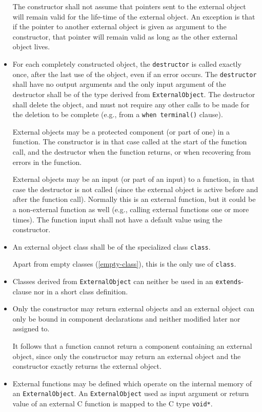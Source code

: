 \begin{itemize}
  The constructor shall not assume that pointers sent to the external object will remain valid for the life-time of the external object.
  An exception is that if the pointer to another external object is given as argument to the constructor, that pointer will remain valid as long as the other external object lives.
\item
  For each completely constructed object, the {\lstinline!destructor!} is called exactly once, after the last use of the object, even if an error occurs.
  The {\lstinline!destructor!} shall have no output arguments and the only input argument of the destructor shall be of the type derived from {\lstinline!ExternalObject!}.
  The destructor shall delete the object, and must not require any other calls to be made for the deletion to be complete (e.g., from a {\lstinline!when terminal()!} clause).
  \begin{nonnormative}
  External objects may be a protected component (or part of one) in a function.
  The constructor is in that case called at the start of the function call, and the destructor when the function returns, or when recovering from errors in the function.
  \end{nonnormative}
  \begin{nonnormative}
  External objects may be an input (or part of an input) to a function, in that case the destructor is not called (since the external object is active before and after the function call).
  Normally this is an external function, but it could be a non-external function as well (e.g., calling external functions one or more times).
  The function input shall not have a default value using the constructor.
  \end{nonnormative}
\item
  An external object class shall be of the specialized class {\lstinline!class!}.
  \begin{nonnormative}
  Apart from empty classes (\cref{empty-class}), this is the only use of {\lstinline!class!}.
  \end{nonnormative}
\item
  Classes derived from {\lstinline!ExternalObject!} can neither be used in an {\lstinline!extends!}-clause nor in a short class definition.
\item
  Only the constructor may return external objects and an external object
  can only be bound in component declarations and neither modified later
  nor assigned to.
  \begin{nonnormative}
  It follows that a function cannot return a component containing an external object, since only the constructor may return an external object and the constructor exactly returns the external object.
  \end{nonnormative}
\item
  External functions may be defined which operate on the internal memory
  of an {\lstinline!ExternalObject!}. An {\lstinline!ExternalObject!} used as input argument or
  return value of an external C function is mapped to the C type
  {\lstinline!void*!}.
\end{itemize}

